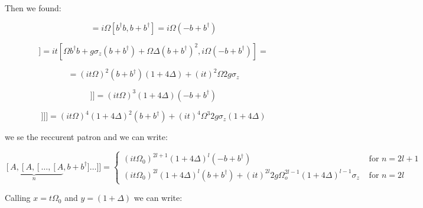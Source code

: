 \documentclass[%
preprint,
onecolumn,
notitlepag,
 amsmath,amssymb,
 aps,
 pra,
]{revtex4-2}
\begin{document}
Then we found:

\begin{equation}
[A, B] = i \Omega [ b^{\dagger}b , b+b^{\dagger}  ] = i \Omega  \left( -b+b^{\dagger}  \right)  
\end{equation}

\begin{equation}
[A,[A, B]]= i  t [  \Omega b^{\dagger}b + g \sigma_z (b+b^{\dagger})  + \Omega \Delta \left( b+ b^{\dagger} \right)^2  , i \Omega  \left( -b+b^{\dagger}  \right)  ] = 
\end{equation}

\begin{equation}
    = (it \Omega)^2 \left( b+ b^{\dagger} \right) \left( 1 + 4 \Delta \right) + (it)^2 \Omega 2 g \sigma_z 
\end{equation}

\begin{equation}
[A,[A,[A, B]]]=  (i t \Omega )^3 (1+4 \Delta) \left(-b + b ^{\dagger}\right)
\end{equation}


\begin{equation}
[A,[A,[A,[A, B]]]]=  (it \Omega )^4 (1+4 \Delta)^2 \left(b + b ^{\dagger} \right) + (i t )^4 \Omega^3 2g \sigma_z (1+4\Delta) 
\end{equation}

we se the reccurent patron and we can write:


\begin{equation}
\underbrace{\left[A,\left[A,\left[\ldots,\left[A \right.\right.\right.\right.}_{n}, b+b^{\dagger}] \ldots]]=\left\{\begin{array}{ll}
(i t \Omega_{0})^{2 l+1}(1+4 \Delta)^{l}\left(-b+b^{\dagger}\right) & \text { for } n=2 l+1 \\
( it \Omega_{0})^{2 l}(1+4 \Delta)^{l}\left(b+b^{\dagger}\right)+ (it)^{2l} 2 g \Omega_{o}^{2 l-1}(1+4 \Delta)^{l-1} \sigma_{z} & \text { for } n=2 l
\end{array}\right.
\end{equation}

Calling $x=t \Omega_0 $ and $y=(1+ \Delta)$ we can write: 


\end{document}
